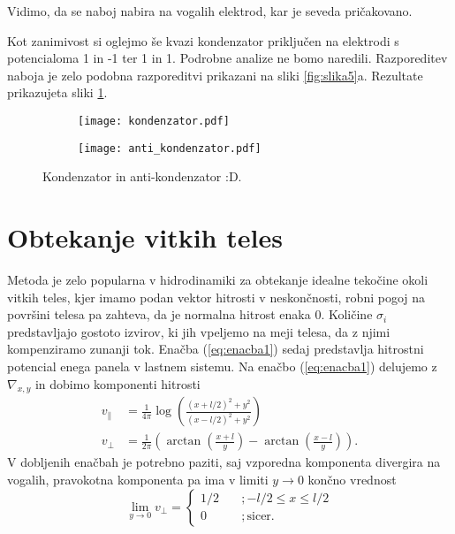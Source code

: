 \documentclass[12pt,a4paper]{article}
\begin{document}
\noindent Vidimo, da se naboj nabira na vogalih elektrod, kar je seveda pričakovano.

Kot zanimivost si oglejmo še kvazi kondenzator priključen na elektrodi s potencialoma 1 in -1 ter 1  in 1. Podrobne analize ne bomo naredili. Razporeditev naboja je zelo podobna razporeditvi prikazani na sliki \ref{fig:slika5}a. Rezultate prikazujeta sliki \ref{fig:slika8}.

\begin{figure}[H]
    \centering
    \begin{subfigure}[b]{0.45\textwidth}  			
        \texttt{[image: kondenzator.pdf]}
    \end{subfigure}
    \begin{subfigure}[b]{0.45\textwidth}  			
        \texttt{[image: anti\_kondenzator.pdf]}
    \end{subfigure}
    \caption{Kondenzator in anti-kondenzator :D.} \label{fig:slika8}
\end{figure}


\section*{Obtekanje vitkih teles}

Metoda je zelo popularna v hidrodinamiki za obtekanje idealne tekočine okoli vitkih teles, kjer imamo podan vektor hitrosti v neskončnosti, robni pogoj na površini telesa pa zahteva, da je normalna hitrost enaka 0. Količine $\sigma _i$ predstavljajo gostoto izvirov, ki jih vpeljemo na meji telesa, da z njimi kompenziramo zunanji tok. Enačba (\ref{eq:enacba1}) sedaj predstavlja hitrostni  potencial enega panela v lastnem sistemu. Na enačbo (\ref{eq:enacba1}) delujemo z $\nabla _{x,y}$ in dobimo komponenti hitrosti
\begin{align}
  v_{\parallel} &=\frac{1}{4 \pi} \log\left( \frac{(x+l/2)^{2} +y^{2}}{(x-l/2)^{2} +y^{2}} \right) \label{eq:enacba3}\\
v_ {\perp}&= \frac{1}{2\pi} \left( \arctan\left( \frac{x+l}{y} \right) - \arctan\left( \frac{x-l}{y}\right) \right). \label{eq:enacba4}
\end{align}
V dobljenih enačbah je potrebno paziti, saj vzporedna komponenta divergira na vogalih, pravokotna komponenta pa ima v limiti $y \rightarrow 0$ končno vrednost
\begin{equation*}
\lim _{y \rightarrow 0} v_{\perp} = \left\{
        \begin{array}{ll}
            1/2 & \quad ;-l/2 \leq x \leq l/2 \\
            0 & \quad ;\textrm{sicer}.
        \end{array}
    \right.
\end{equation*}
\end{document}
